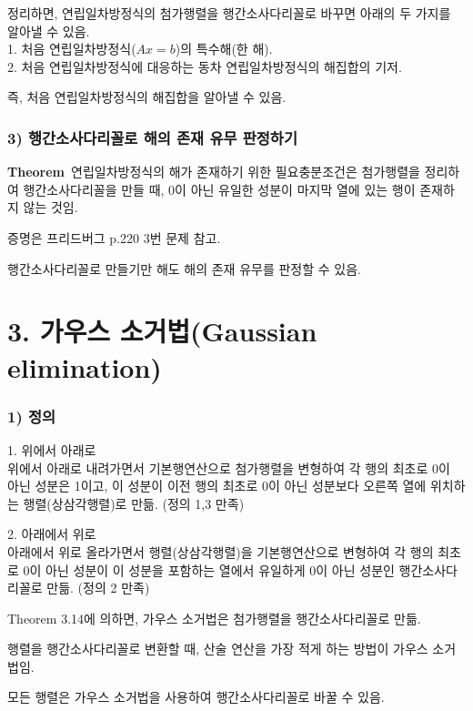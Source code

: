 정리하면, 연립일차방정식의 첨가행렬을 행간소사다리꼴로 바꾸면 아래의 두 가지를 알아낼 수 있음.\\
1. 처음 연립일차방정식($Ax=b$)의 특수해(한 해).\\
2. 처음 연립일차방정식에 대응하는 동차 연립일차방정식의 해집합의 기저.

즉, 처음 연립일차방정식의 해집합을 알아낼 수 있음.

\subsubsection*{3) 행간소사다리꼴로 해의 존재 유무 판정하기}
\textbf{Theorem}\, 연립일차방정식의 해가 존재하기 위한 필요충분조건은 첨가행렬을 정리하여 행간소사다리꼴을 만들 때, 0이 아닌 유일한 성분이 마지막 열에 있는 행이 존재하지 않는 것임.

증명은 프리드버그 p.220 3번 문제 참고.

행간소사다리꼴로 만들기만 해도 해의 존재 유무를 판정할 수 있음.\\


\section*{3. 가우스 소거법(Gaussian elimination)}
\subsubsection*{1) 정의\\}
\begin{DEF}
1. 위에서 아래로\\
위에서 아래로 내려가면서 기본행연산으로 첨가행렬을 변형하여 각 행의 최초로 0이 아닌 성분은 1이고, 이 성분이 이전 행의 최초로 0이 아닌 성분보다 오른쪽 열에 위치하는 행렬(상삼각행렬)로 만듦. (정의 1,3 만족)

2. 아래에서 위로\\
아래에서 위로 올라가면서 행렬(상삼각행렬)을 기본행연산으로 변형하여 각 행의 최초로 0이 아닌 성분이 이 성분을 포함하는 열에서 유일하게 0이 아닌 성분인 행간소사다리꼴로 만듦. (정의 2 만족)
\end{DEF}

Theorem 3.14에 의하면, 가우스 소거법은 첨가행렬을 행간소사다리꼴로 만듦.

행렬을 행간소사다리꼴로 변환할 때, 산술 연산을 가장 적게 하는 방법이 가우스 소거법임.

모든 행렬은 가우스 소거법을 사용하여 행간소사다리꼴로 바꿀 수 있음.\\


